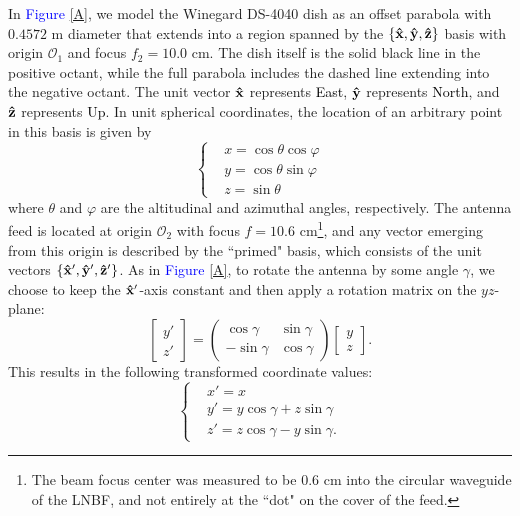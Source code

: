 \documentclass[11pt]{article}
\begin{document}
In \textcolor{blue}{Figure} \ref{A}, we model the {Winegard DS-4040 dish} as an offset parabola with $0.4572$ m diameter that extends into a region spanned by the $\{\bold{\hat{x}},\bold{\hat{y}},\bold{\hat{z}}\}$ basis with origin $\mathcal{O}_1$ and focus $f_2 = 10.0$ cm. The dish itself is the solid black line in the positive octant, while the full parabola includes the dashed line extending into the negative octant. The unit vector $\bold{\hat{x}}$ represents \textcolor{black}{East}, $\bold{\hat{y}}$ represents \textcolor{black}{North}, and $\bold{\hat{z}}$ represents \textcolor{black}{Up}. In unit spherical coordinates, the location of an arbitrary point in this basis is given by
	\begin{equation}
\left\{\begin{matrix}
&x=\cos\theta\cos\varphi\\ 
&y=\cos\theta\sin\varphi\\ 
&z=\sin\theta
\end{matrix}\right.	\end{equation}
where $\theta$ and $\varphi$ are the altitudinal and azimuthal angles, respectively. The antenna feed is located at origin $\mathcal{O}_2$ with focus $f=10.6$ cm\footnote{The beam focus center was measured to be 0.6 cm into the circular waveguide of the LNBF, and not entirely at the ``dot" on the cover of the feed.}, and any vector emerging from this origin is described by the ``primed" basis, which consists of the unit vectors $\{\bold{\hat{x}'},\bold{\hat{y}'},\bold{\hat{z}'}\}$. As in \textcolor{blue}{Figure} \ref{A}, to rotate the antenna by some angle $\gamma$, we choose to keep the $\bold{\hat{x}'}$-axis constant and then apply a rotation matrix on the $yz$-plane:
	\begin{equation}
		\begin{bmatrix}
y'\\ 
z'
\end{bmatrix} = \begin{pmatrix}
\cos\gamma &\sin\gamma \\ 
 -\sin\gamma&\cos\gamma 
\end{pmatrix}\begin{bmatrix}
y\\ 
z
\end{bmatrix}.
	\end{equation}
This results in the following transformed coordinate values:
\begin{equation}
\left\{\begin{matrix}
&x'=x\\ 
&y'=y\cos\gamma+z\sin\gamma\\ 
&z'=z\cos\gamma-y\sin\gamma.
\end{matrix}\right.
\end{equation}
\end{document}
